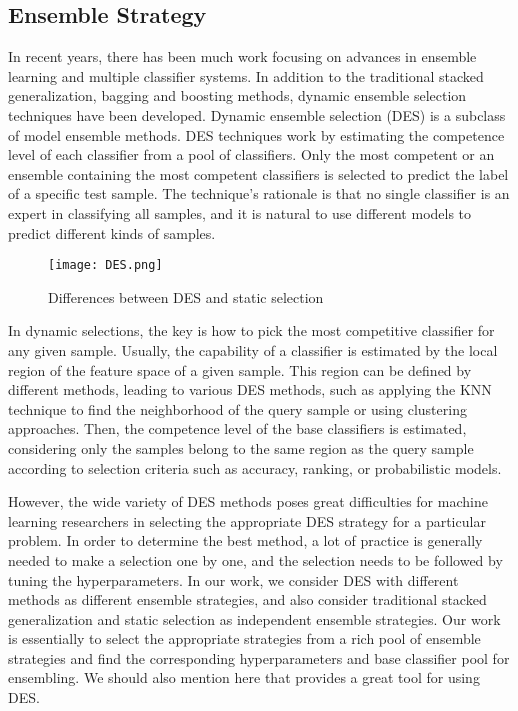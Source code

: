 \documentclass[review]{elsarticle}
\begin{document}
\subsection{Ensemble Strategy}
In recent years, there has been much work focusing on advances in ensemble learning and multiple classifier systems\cite{britto2014dynamic}\cite{cruz2018dynamic}. In addition to the traditional stacked generalization, bagging and boosting methods, dynamic ensemble selection techniques have been developed. Dynamic ensemble selection (DES) is a subclass of model ensemble methods. DES techniques work by estimating the competence level of each classifier from a pool of classifiers. Only the most competent or an ensemble containing the most competent classifiers is selected to predict the label of a specific test sample. The technique's rationale is that no single classifier is an expert in classifying all samples, and it is natural to use different models to predict different kinds of samples.
\begin{figure}[htbp]
	\centering
	\texttt{[image: DES.png]}
	\caption{Differences between DES and static selection}
\end{figure}
In dynamic selections, the key is how to pick the most competitive classifier for any given sample. Usually, the capability of a classifier is estimated by the local region of the feature space of a given sample. This region can be defined by different methods, leading to various DES methods, such as applying the KNN technique to find the neighborhood of the query sample or using clustering approaches\cite{kuncheva2000clustering}\cite{soares2006using}. Then, the competence level of the base classifiers is estimated, considering only the samples belong to the same region as the query sample according to selection criteria such as accuracy, ranking, or probabilistic models\cite{woloszynski2012measure}.

However, the wide variety of DES methods poses great difficulties for machine learning researchers in selecting the appropriate DES strategy for a particular problem. In order to determine the best method, a lot of practice is generally needed to make a selection one by one, and the selection needs to be followed by tuning the hyperparameters. In our work, we consider DES with different methods as different ensemble strategies, and also consider traditional stacked generalization and static selection as independent ensemble strategies. Our work is essentially to select the appropriate strategies from a rich pool of ensemble strategies and find the corresponding hyperparameters and base classifier pool for ensembling. We should also mention here that \cite{cruz2020deslib} provides a great tool for using DES.
\end{document}
